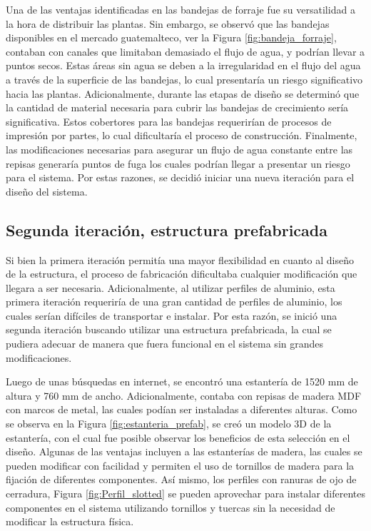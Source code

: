 Una de las ventajas identificadas en las bandejas de forraje fue su versatilidad a la hora de distribuir las plantas. Sin embargo, se observó que las bandejas disponibles en el mercado guatemalteco, ver la Figura \ref{fig:bandeja_forraje}, contaban con canales que limitaban demasiado el flujo de agua, y podrían llevar a puntos secos. Estas áreas sin agua se deben a la irregularidad en el flujo del agua a través de la superficie de las bandejas, lo cual presentaría un riesgo significativo hacia las plantas. Adicionalmente, durante las etapas de diseño se determinó que la cantidad de material necesaria para cubrir las bandejas de crecimiento sería significativa. Estos cobertores para las bandejas requerirían de procesos de impresión por partes, lo cual dificultaría el proceso de construcción. Finalmente, las modificaciones necesarias para asegurar un flujo de agua constante entre las repisas generaría puntos de fuga los cuales podrían llegar a presentar un riesgo para el sistema. Por estas razones, se decidió iniciar una nueva iteración para el diseño del sistema.

\subsection{Segunda iteración, estructura prefabricada}

Si bien la primera iteración permitía una mayor flexibilidad en cuanto al diseño de la estructura, el proceso de fabricación dificultaba cualquier modificación que llegara a ser necesaria. Adicionalmente, al utilizar perfiles de aluminio, esta primera iteración requeriría de una gran cantidad de perfiles de aluminio, los cuales serían difíciles de transportar e instalar. Por esta razón, se inició una segunda iteración buscando utilizar una estructura prefabricada, la cual se pudiera adecuar de manera que fuera funcional en el sistema sin grandes modificaciones.

Luego de unas búsquedas en internet, se encontró una estantería de 1520 mm de altura y 760 mm de ancho. Adicionalmente, contaba con repisas de madera MDF con marcos de metal, las cuales podían ser instaladas a diferentes alturas. Como se observa en la Figura \ref{fig:estanteria_prefab}, se creó un modelo 3D de la estantería, con el cual fue posible observar los beneficios de esta selección en el diseño. Algunas de las ventajas incluyen a las estanterías de madera, las cuales se pueden modificar con facilidad y permiten el uso de tornillos de madera para la fijación de diferentes componentes. Así mismo, los perfiles con ranuras de ojo de cerradura, Figura \ref{fig:Perfil_slotted} se pueden aprovechar para instalar diferentes componentes en el sistema utilizando tornillos y tuercas sin la necesidad de modificar la estructura física. 

